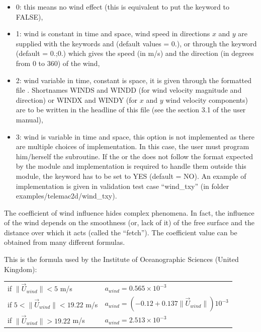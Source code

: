 \begin{itemize}
\item 0: this means no wind effect (this is equivalent to put the
 keyword  to FALSE),

\item 1: wind is constant in time and space, wind speed in directions
$x$ and $y$ are supplied with the keywords  and
 (default values = 0.),
or through the keyword  (default = 0.;0.)
which gives the speed (in m/s) and the direction (in degrees from 0 to 360) of
the wind,

\item 2: wind variable in time, constant is space,
it is given through the formatted file .
Shortnames WINDS and WINDD (for wind velocity magnitude and direction) or
WINDX and WINDY (for $x$ and $y$ wind velocity components) are to be written
in the headline of this file (see the section 3.1 of the \waqtel user manual),

\item 3: wind is variable in time and space, this option is not
implemented as there are multiple choices of implementation.
In this case, the user must program him/herself the  subroutine.
If the  or the
 does not follow the format expected by the
 module and implementation is required to handle them
outside this module, the keyword 
has to be set to YES (default = NO).
An example of implementation is given in validation test case ``wind\_txy''
(in folder examples/telemac2d/wind\_txy).
\end{itemize}

The coefficient of wind influence hides complex phenomena.
In fact, the influence of the wind depends on the smoothness (or, lack of it)
of the free surface and the distance over which it acts (called the ``fetch'').
The coefficient value can be obtained from many different formulas.

This is the formula used by the Institute of Oceanographic Sciences
(United Kingdom):

\begin{table}[h!]
\begin{center}
\begin{tabular}{ll}

if $\| \vec{U}_{wind} \| < 5$ m/s & $a_{wind}  = 0.565 \times 10^{-3}$ \\
if $5 < \| \vec{U}_{wind} \| < 19.22$ m/s &
 $a_{wind} = (- 0.12 + 0.137 \| \vec{U}_{wind} \| ) 10^{-3}$ \\
if $\| \vec{U}_{wind} \| > 19.22$ m/s & $a_{wind} = 2.513 \times 10^{-3}$ \\
\end{tabular}
\end{center}
\end{table}

